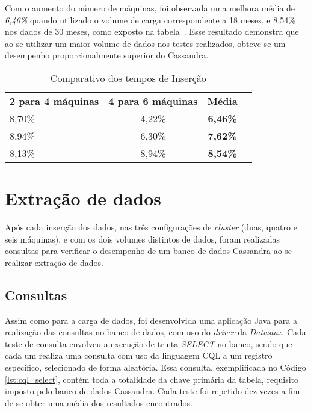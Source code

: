 Com o aumento do número de máquinas, foi observada uma melhora média de \emph{6,46\%} quando utilizado o volume de carga correspondente a 18 meses, e {8,54\%} nos dados de 30 meses, como exposto na tabela~\cite{tb:comparativo_insert}. Esse resultado demonstra que ao se utilizar um maior volume de dados nos testes realizados, obteve-se um desempenho proporcionalmente superior do Cassandra.

\begin{table}[]
	\centering
	\caption{Comparativo dos tempos de Inserção}
	\label{tb:comparativo_insert}
	\begin{tabular}{|l|c|c|l}
		\cline{1-3}
		\textbf{2 para 4 máquinas} & \textbf{4 para 6 máquinas} & \textbf{Média}  &  \\ \cline{1-3}
		8,70\%                     & 4,22\%                     & \textbf{6,46\%} &  \\ \cline{1-3}
		8,94\%                     & 6,30\%                     & \textbf{7,62\%} &  \\ \cline{1-3}
		8,13\%                     & 8,94\%                     & \textbf{8,54\%} &  \\ \cline{1-3}
	\end{tabular}
\end{table}


\section{Extração de dados}
Após cada inserção dos dados, nas três configurações de \emph{cluster} (duas, quatro e seis máquinas), e com os dois volumes distintos de dados, foram realizadas consultas para verificar o desempenho de um banco de dados Cassandra ao se realizar extração de dados.

\subsection{Consultas}
Assim como para a carga de dados, foi desenvolvida uma aplicação Java para a realização das consultas no banco de dados, com uso do \emph{driver} da \emph{Datastax}. Cada teste de consulta envolveu a execução de trinta \emph{SELECT} no banco, sendo que cada um realiza uma consulta com uso da linguagem CQL a um registro específico, selecionado de forma aleatória. Essa consulta, exemplificada no Código \ref{lst:cql_select}, contém toda a totalidade da chave primária da tabela, requisito imposto pelo banco de dados Cassandra. Cada teste foi repetido dez vezes a fim de se obter uma média dos resultados encontrados.

